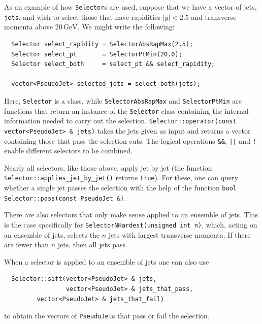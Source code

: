 \documentclass[12pt,a4]{article}
\newcommand{\ttt}[1]{{\small\texttt{#1}}}
\newcommand{\GeV}{\,\text{GeV}}
\begin{document}
As an example of how \ttt{Selector}s are used, suppose that we  have a vector of jets, \ttt{jets},
and wish to select those that have rapidities $|y|<2.5$ and transverse
momenta above $20\GeV$. We might write the following:
\begin{lstlisting}
  Selector select_rapidity = SelectorAbsRapMax(2.5);
  Selector select_pt       = SelectorPtMin(20.0);
  Selector select_both     = select_pt && select_rapidity;
  
  vector<PseudoJet> selected_jets = select_both(jets);
\end{lstlisting}
Here, \ttt{Selector} is a class, while \ttt{SelectorAbsRapMax} and
\ttt{SelectorPtMin} are functions that return an instance of the
\ttt{Selector} class containing the internal information needed to
carry out the selection.
%
\ttt{Selector::operator(const vector<PseudoJet> \& jets)} takes the
jets given as input and returns a vector containing those that pass
the selection cuts. The logical operations \ttt{\&\&}, \ttt{||} and
\ttt{!} enable different selectors to be combined.
%

Nearly all selectors, like those above, apply jet by jet (the function
\ttt{Selector::applies\_jet\_by\_jet()} returns \ttt{true}). 
%
For these, one can
query whether a single jet passes the selection with the help of the
function \ttt{bool Selector::pass(const PseudoJet \&)}.

There are also selectors that only make sense applied to an ensemble
of jets. 
%
This is the case specifically for \ttt{SelectorNHardest(unsigned
  int n)}, which, acting on an ensemble of jets, selects the $n$ jets with
largest transverse momenta. If there are fewer than $n$ jets, then all
jets pass.

When a selector is applied to an ensemble of jets one can also use
\begin{lstlisting}
  Selector::sift(vector<PseudoJet> & jets, 
                 vector<PseudoJet> & jets_that_pass, 
		 vector<PseudoJet> & jets_that_fail)		 
\end{lstlisting}
to obtain the vectors of \ttt{PseudoJet}s that pass or fail the selection.
\end{document}
